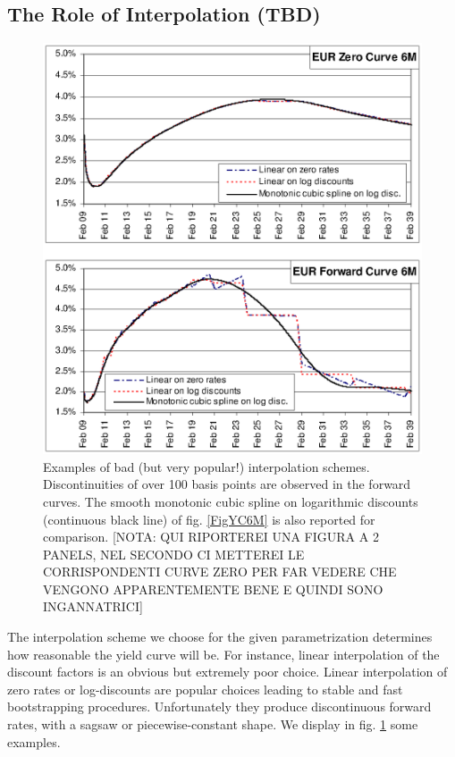 \documentclass[11pt,reqno]{amsart}
\begin{document}
\subsection{\label{sec:Interp}The Role of Interpolation (TBD)}
\begin{figure}[tbp]
\centering
\includegraphics[scale=0.7]{../figures/FigInterpolations}
\caption{Examples of bad (but very popular!) interpolation schemes. Discontinuities of over 100 basis points are observed in the forward curves. The smooth monotonic cubic spline on logarithmic discounts (continuous black line) of fig. \ref{FigYC6M} is also reported for comparison. [NOTA: QUI RIPORTEREI UNA FIGURA A 2 PANELS, NEL SECONDO CI METTEREI LE CORRISPONDENTI CURVE ZERO PER FAR VEDERE CHE VENGONO APPARENTEMENTE BENE E QUINDI SONO INGANNATRICI]}
\label{fig:Interpolations}
\end{figure}
The interpolation scheme we choose for the given parametrization determines how reasonable the yield curve will be. For instance, linear interpolation of the discount factors is an obvious but extremely poor choice. Linear interpolation of zero rates or log-discounts are popular choices leading to stable and fast bootstrapping procedures. Unfortunately they produce discontinuous forward rates, with a sagsaw or piecewise-constant shape. We display in fig. \ref{fig:Interpolations} some examples.
\end{document}
